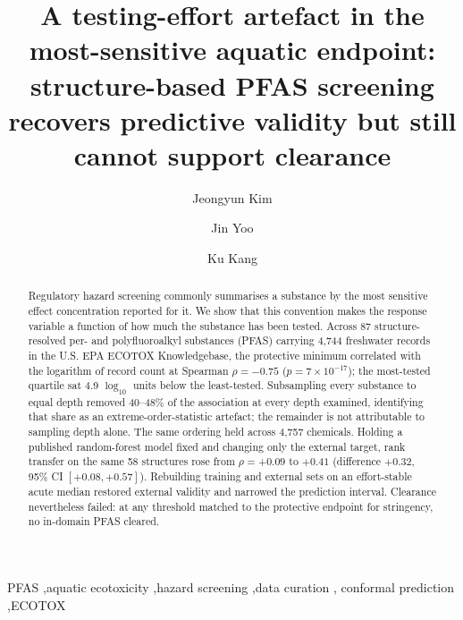 \documentclass[preprint,12pt]{elsarticle}
\begin{document}
\begin{frontmatter}

\title{A testing-effort artefact in the most-sensitive aquatic endpoint:
structure-based PFAS screening recovers predictive validity but still cannot
support clearance}

\author[snu]{Jeongyun Kim}
\author[cbdri]{Jin Yoo}
\author[cbdri]{Ku Kang}

\begin{abstract}
Regulatory hazard screening commonly summarises a substance by the most
sensitive effect concentration reported for it. We show that this convention
makes the response variable a function of how much the substance has been
tested. Across 87 structure-resolved per- and polyfluoroalkyl substances (PFAS)
carrying 4{,}744 freshwater records in the U.S. EPA ECOTOX Knowledgebase, the
protective minimum correlated with the logarithm of record count at Spearman
$\rho=-0.75$ ($p=7\times10^{-17}$); the most-tested quartile sat 4.9
$\log_{10}$ units below the least-tested. Subsampling every substance to equal
depth removed 40--48\% of the association at every depth examined, identifying
that share as an extreme-order-statistic artefact; the remainder is not
attributable to sampling depth alone. The same ordering held across 4{,}757
chemicals. Holding a published random-forest model fixed and changing only the
external target, rank transfer on the same 58 structures rose from
$\rho=+0.09$ to $+0.41$ (difference $+0.32$, 95\% CI $[+0.08,+0.57]$).
Rebuilding training and external sets on an effort-stable acute median restored
external validity and narrowed the prediction interval. Clearance nevertheless
failed: at any threshold matched to the protective endpoint for stringency, no
in-domain PFAS cleared.
\end{abstract}

\begin{keyword}
PFAS \sep aquatic ecotoxicity \sep hazard screening \sep data curation \sep
conformal prediction \sep ECOTOX
\end{keyword}
\end{frontmatter}
\end{document}
